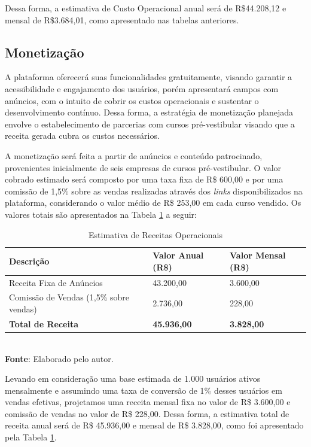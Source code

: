 Dessa forma, a estimativa de Custo Operacional anual será de R\$44.208,12 e mensal de R\$3.684,01, como apresentado nas tabelas anteriores.


\subsection{Monetização}

A plataforma oferecerá suas funcionalidades gratuitamente, visando garantir a acessibilidade e engajamento dos usuários, porém apresentará campos com anúncios, com o intuito de cobrir os custos operacionais e sustentar o desenvolvimento contínuo. Dessa forma, a estratégia de monetização planejada envolve o estabelecimento de parcerias com cursos pré-vestibular visando que a receita gerada cubra os custos necessários. 

A monetização será feita a partir de anúncios e conteúdo patrocinado, provenientes inicialmente de seis empresas de cursos pré-vestibular. O valor cobrado estimado será composto por uma taxa fixa de R\$ 600,00 e por uma comissão de 1,5\% sobre as vendas realizadas através dos \textit{links} disponibilizados na plataforma, considerando o valor médio de R\$ 253,00 em cada curso vendido. Os valores totais são apresentados na Tabela \ref{table:estimativa-receitas} a seguir: 

\begin{table}[h!]
\centering
\caption{Estimativa de Receitas Operacionais}
\begin{tabular}{|m{6cm}|m{4cm}|m{4cm}|}
\hline
\textbf{Descrição} & \textbf{Valor Anual (R\$)} & \textbf{Valor Mensal (R\$)} \\
\hline
Receita Fixa de Anúncios & 43.200,00 & 3.600,00 \\
\hline
Comissão de Vendas (1,5\% sobre vendas) & 2.736,00 & 228,00 \\
\hline
\textbf{Total de Receita} & \textbf{45.936,00} & \textbf{3.828,00} \\
\hline
\end{tabular}
\label{table:estimativa-receitas}
\\[1ex]
\footnotesize \textbf{Fonte}: Elaborado pelo autor.
\end{table}

Levando em consideração uma base estimada de 1.000 usuários ativos mensalmente e assumindo uma taxa de conversão de 1\% desses usuários em vendas efetivas, projetamos uma receita mensal fixa no valor de R\$ 3.600,00 e comissão de vendas no valor de R\$ 228,00. Dessa forma, a estimativa total de receita anual será de R\$ 45.936,00 e mensal de R\$ 3.828,00, como foi apresentado pela Tabela \ref{table:estimativa-receitas}.


